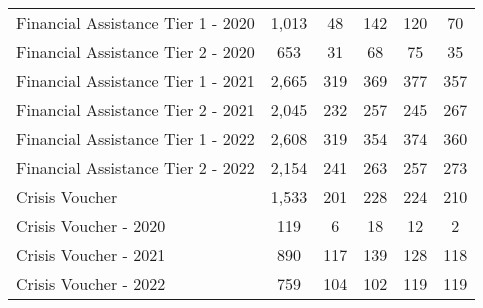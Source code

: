 \begin{tabular}{l|c|c|c|c|c}
\midrule 
\quad Financial Assistance Tier 1 - 2020 & 1,013 & 48 & 142 & 120 & 70 \\
\quad Financial Assistance Tier 2 - 2020 & 653 & 31 & 68 & 75 & 35 \\
\quad Financial Assistance Tier 1 - 2021 & 2,665 & 319 & 369 & 377 & 357 \\
\quad Financial Assistance Tier 2 - 2021 & 2,045 & 232 & 257 & 245 & 267 \\
\quad Financial Assistance Tier 1 - 2022 & 2,608 & 319 & 354 & 374 & 360 \\
\quad Financial Assistance Tier 2 - 2022 & 2,154 & 241 & 263 & 257 & 273 \\
\midrule 
Crisis Voucher & 1,533 & 201 & 228 & 224 & 210 \\
\quad Crisis Voucher - 2020 & 119 & 6 & 18 & 12 & 2 \\
\quad Crisis Voucher - 2021 & 890 & 117 & 139 & 128 & 118 \\
\quad Crisis Voucher - 2022 & 759 & 104 & 102 & 119 & 119 \\
\midrule 
\bottomrule 
\end{tabular}
